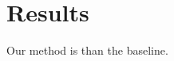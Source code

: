\documentclass{article}
\begin{document}
\section{Results}
Our method is  than the baseline.
\end{document}
